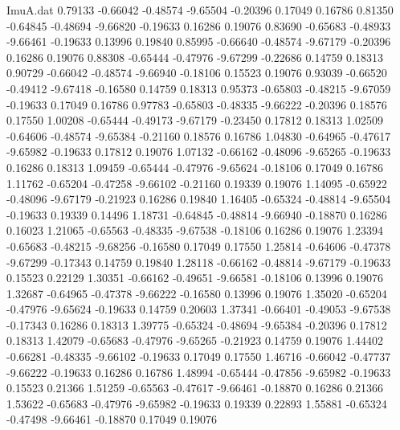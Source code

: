 \begin{filecontents}{ImuA.dat}
   0.79133   -0.66042   -0.48574   -9.65504   -0.20396    0.17049    0.16786
   0.81350   -0.64845   -0.48694   -9.66820   -0.19633    0.16286    0.19076
   0.83690   -0.65683   -0.48933   -9.66461   -0.19633    0.13996    0.19840
   0.85995   -0.66640   -0.48574   -9.67179   -0.20396    0.16286    0.19076
   0.88308   -0.65444   -0.47976   -9.67299   -0.22686    0.14759    0.18313
   0.90729   -0.66042   -0.48574   -9.66940   -0.18106    0.15523    0.19076
   0.93039   -0.66520   -0.49412   -9.67418   -0.16580    0.14759    0.18313
   0.95373   -0.65803   -0.48215   -9.67059   -0.19633    0.17049    0.16786
   0.97783   -0.65803   -0.48335   -9.66222   -0.20396    0.18576    0.17550
   1.00208   -0.65444   -0.49173   -9.67179   -0.23450    0.17812    0.18313
   1.02509   -0.64606   -0.48574   -9.65384   -0.21160    0.18576    0.16786
   1.04830   -0.64965   -0.47617   -9.65982   -0.19633    0.17812    0.19076
   1.07132   -0.66162   -0.48096   -9.65265   -0.19633    0.16286    0.18313
   1.09459   -0.65444   -0.47976   -9.65624   -0.18106    0.17049    0.16786
   1.11762   -0.65204   -0.47258   -9.66102   -0.21160    0.19339    0.19076
   1.14095   -0.65922   -0.48096   -9.67179   -0.21923    0.16286    0.19840
   1.16405   -0.65324   -0.48814   -9.65504   -0.19633    0.19339    0.14496
   1.18731   -0.64845   -0.48814   -9.66940   -0.18870    0.16286    0.16023
   1.21065   -0.65563   -0.48335   -9.67538   -0.18106    0.16286    0.19076
   1.23394   -0.65683   -0.48215   -9.68256   -0.16580    0.17049    0.17550
   1.25814   -0.64606   -0.47378   -9.67299   -0.17343    0.14759    0.19840
   1.28118   -0.66162   -0.48814   -9.67179   -0.19633    0.15523    0.22129
   1.30351   -0.66162   -0.49651   -9.66581   -0.18106    0.13996    0.19076
   1.32687   -0.64965   -0.47378   -9.66222   -0.16580    0.13996    0.19076
   1.35020   -0.65204   -0.47976   -9.65624   -0.19633    0.14759    0.20603
   1.37341   -0.66401   -0.49053   -9.67538   -0.17343    0.16286    0.18313
   1.39775   -0.65324   -0.48694   -9.65384   -0.20396    0.17812    0.18313
   1.42079   -0.65683   -0.47976   -9.65265   -0.21923    0.14759    0.19076
   1.44402   -0.66281   -0.48335   -9.66102   -0.19633    0.17049    0.17550
   1.46716   -0.66042   -0.47737   -9.66222   -0.19633    0.16286    0.16786
   1.48994   -0.65444   -0.47856   -9.65982   -0.19633    0.15523    0.21366
   1.51259   -0.65563   -0.47617   -9.66461   -0.18870    0.16286    0.21366
   1.53622   -0.65683   -0.47976   -9.65982   -0.19633    0.19339    0.22893
   1.55881   -0.65324   -0.47498   -9.66461   -0.18870    0.17049    0.19076

\end{filecontents}
